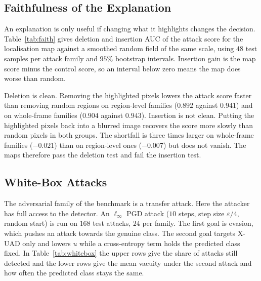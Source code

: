 \documentclass[conference]{IEEEtran}
\newcommand{\sub}[1]{\subsection{\texorpdfstring{\textbf{#1}}{#1}}}
\begin{document}
\begin{table}[t]
\centering
\caption{Localisation IoU (\%)}
\label{tab:loc}
\scriptsize
\resizebox{\linewidth}{!}{}
\end{table}

\sub{Faithfulness of the Explanation}
An explanation is only useful if changing what it highlights changes the decision.
Table~\ref{tab:faith} gives deletion and insertion AUC \cite{petsiuk2018rise} of the
attack score for the localisation map against a smoothed random field of the same
scale, using $48$ test samples per attack family and $95\%$ bootstrap intervals.
Insertion gain is the map score minus the control score, so an interval below zero
means the map does worse than random.

\begin{table}[t]
\centering
\caption{Faithfulness of the map}
\label{tab:faith}
\scriptsize
\resizebox{\linewidth}{!}{}
\end{table}

Deletion is clean. Removing the highlighted pixels lowers the attack score faster
than removing random regions on region-level families ($0.892$ against $0.941$) and
on whole-frame families ($0.904$ against $0.943$). Insertion is not clean. Putting the
highlighted pixels back into a blurred image recovers the score more slowly than
random pixels in both groups. The shortfall is three times larger on whole-frame
families ($-0.021$) than on region-level ones ($-0.007$) but does not vanish. The maps
therefore pass the deletion test and fail the insertion test.

\sub{White-Box Attacks}
The adversarial family of the benchmark is a transfer attack. Here the attacker has
full access to the detector. An $\ell_\infty$ PGD attack \cite{madry2018pgd} ($10$
steps, step size $\varepsilon/4$, random start) is run on $168$ test attacks, $24$
per family. The first goal is evasion, which pushes an attack towards the genuine
class. The second goal targets X-UAD only and lowers $u$ while a cross-entropy term
holds the predicted class fixed. In Table~\ref{tab:whitebox} the upper rows give the
share of attacks still detected and the lower rows give the mean vacuity under the
second attack and how often the predicted class stays the same.

\begin{table}[t]
\centering
\caption{White-box PGD results}
\label{tab:whitebox}
\scriptsize
\resizebox{\linewidth}{!}{}
\end{table}
\end{document}
